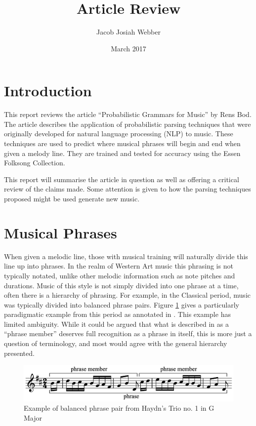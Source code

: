 \documentclass[a4paper,12pt]{article}
\title{Article Review}
\author{Jacob Josiah Webber}
\date{March 2017}
\begin{document}
\maketitle

\section{Introduction}
This report reviews the article ``Probabilistic Grammars for Music'' \cite{Bod_probabilisticgrammars} by Rens Bod. The article describes the application of probabilistic parsing techniques that were originally developed for natural language processing (NLP) to music. These techniques are used to predict where musical phrases will begin and end when given a melody line. They are trained and tested for accuracy using the Essen Folksong Collection.

This report will summarise the article in question as well as offering a critical review of the claims made. Some attention is given to how the parsing techniques proposed might be used generate new music.

\section{Musical Phrases}
\label{phrases}
When given a melodic line, those with musical training will naturally divide this line up into phrases. In the realm of Western Art music this phrasing is not typically notated, unlike other melodic information such as note pitches and durations. Music of this style is not simply divided into one phrase at a time, often there is a hierarchy of phrasing. For example, in the Classical period, music was typically divided into balanced phrase pairs. Figure \ref{haydn} gives a particularly paradigmatic example from this period as annotated in \cite{music-theory}. This example has limited ambiguity. While it could be argued that what is described in \cite{music-theory} as a ``phrase member'' deserves full recognition as a phrase in itself, this is more just a question of terminology, and most would agree with the general hierarchy presented.

\begin{figure}
\centering
\includegraphics[width=\textwidth]{diagrams/Haydn}
\caption{Example of balanced phrase pair from  Haydn's Trio no. 1 in G Major}
\label{haydn}
\end{figure}
\end{document}
